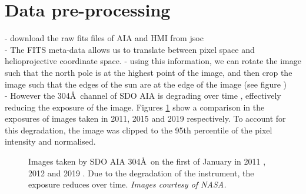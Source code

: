 \documentclass[11pt,a4paper,onecolumn]{report}
\begin{document}
\section{Data pre-processing}
- download the raw fits files of AIA and HMI from jsoc \\
- The FITS meta-data allows us to translate between pixel space and
helioprojective coordinate space.
- using this information, we can rotate the image such that the north pole is at
the highest point of the image, and then crop the image such that the edges of
the sun are at the edge of the image (see figure %
) \\

 - However the 304\AA \ channel of SDO AIA is degrading over time
 \cite{boerner_photometric_2014}, effectively reducing the exposure of the
 image. Figures \ref{fig:aia_degradation} show a comparison in the exposures of
 images taken in 2011, 2015 and 2019 respectively. To account for this
 degradation, the image was clipped to the 95th percentile of the pixel
 intensity and normalised. 


 \begin{figure}[t]%
  \centering
  \qquad
  \qquad
  \caption[]{
    Images taken by SDO AIA 304\AA \ on the first of January in
    2011 , 2012  and 2019
    . Due to the degradation of the instrument, the
    exposure reduces over time. \textit{Images courtesy of NASA.}}
  \label{fig:aia_degradation}
\end{figure}
\end{document}
